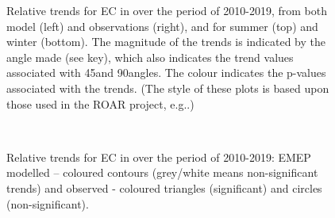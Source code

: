 \begin{figure}
\caption{Relative trends for EC in \pmfine over the period of 2010-2019, from both model (left) and observations (right), and for summer (top) and winter (bottom). The magnitude of the trends is indicated by the angle made (see key), which also indicates the trend values associated with 45\degrees and 90\degrees angles. The colour indicates the p-values associated with the trends. (The style of these plots is based upon those used in the ROAR project, e.g.\citealt{MillsTOAR:2018}.) 
  \label{fig:ECarrows}}
\end{figure}
\begin{figure}  %
  \\
\caption{Relative trends for EC in \pmfine over the period of 2010-2019: EMEP modelled -- coloured contours (grey/white means non-significant trends) and observed - coloured triangles (significant) and circles (non-significant).}
\label{fig:ECtrends}
\end{figure}


